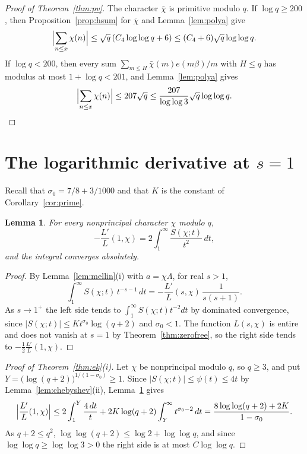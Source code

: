 \documentclass[12pt]{amsart}
\numberwithin{equation}{section}
\newtheorem{lemma}[theorem]{Lemma}
\theoremstyle{definition}
\begin{document}
\begin{proof}[Proof of Theorem~\ref{thm:pv}]
The character $\bar\chi$ is primitive modulo $q$. If $\log q\ge200$, then
Proposition~\ref{prop:hsum} for $\bar\chi$ and Lemma~\ref{lem:polya} give
\[
  \Bigl|\sum_{n\le x}\chi(n)\Bigr|\le\sqrt q\,(C_4\log\log q+6)\le(C_4+6)\sqrt q\log\log q.
\]
If $\log q<200$, then every sum $\sum_{m\le H}\bar\chi(m)e(m\beta)/m$ with $H\le q$ has modulus at
most $1+\log q<201$, and Lemma~\ref{lem:polya} gives
\[
  \Bigl|\sum_{n\le x}\chi(n)\Bigr|\le207\sqrt q\le\frac{207}{\log\log3}\sqrt q\log\log q.\qedhere
\]
\end{proof}

\section{The logarithmic derivative at \texorpdfstring{$s=1$}{s=1}}\label{sec:ek}

Recall that $\sigma_0=7/8+3/1000$ and that $K$ is the constant of Corollary~\ref{cor:prime}.

\begin{lemma}\label{lem:atone}
For every nonprincipal character $\chi$ modulo $q$,
\[
  -\frac{L'}{L}(1,\chi)=2\int_1^\infty\frac{S(\chi;t)}{t^2}\,dt,
\]
and the integral converges absolutely.
\end{lemma}

\begin{proof}
By Lemma~\ref{lem:mellin}(i) with $a=\chi\Lambda$, for real $s>1$,
\[
  \int_1^\infty S(\chi;t)\,t^{-s-1}\,dt=-\frac{L'}{L}(s,\chi)\,\frac1{s(s+1)}.
\]
As $s\to1^+$ the left side tends to $\int_1^\infty S(\chi;t)t^{-2}dt$ by dominated convergence,
since $|S(\chi;t)|\le Kt^{\sigma_0}\log(q+2)$ and $\sigma_0<1$. The function $L(s,\chi)$ is
entire and does not vanish at $s=1$ by Theorem~\ref{thm:zerofree}, so the right side tends to
$-\frac12\frac{L'}{L}(1,\chi)$.
\end{proof}

\begin{proof}[Proof of Theorem~\ref{thm:ek}(i)]
Let $\chi$ be nonprincipal modulo $q$, so $q\ge3$, and put
$Y=\bigl(\log(q+2)\bigr)^{1/(1-\sigma_0)}\ge1$. Since $|S(\chi;t)|\le\psi(t)\le4t$ by
Lemma~\ref{lem:chebyshev}(ii), Lemma~\ref{lem:atone} gives
\[
  \Bigl|\frac{L'}{L}(1,\chi)\Bigr|\le2\int_1^Y\frac{4\,dt}t
  +2K\log(q+2)\int_Y^\infty t^{\sigma_0-2}\,dt
  =\frac{8\log\log(q+2)+2K}{1-\sigma_0}.
\]
As $q+2\le q^2$, $\log\log(q+2)\le\log2+\log\log q$, and since $\log\log q\ge\log\log3>0$ the
right side is at most $C\log\log q$.
\end{proof}
\end{document}

